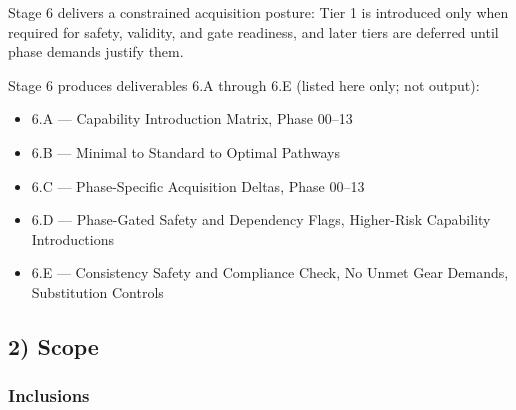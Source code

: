 \documentclass[10pt]{article}
\begin{document}
Stage 6 delivers a constrained acquisition posture: Tier 1 is introduced only when required for safety, validity, and gate readiness, and later tiers are deferred until phase demands justify them.

Stage 6 produces deliverables 6.A through 6.E (listed here only; not output):

\begin{itemize}
\item 6.A — Capability Introduction Matrix, Phase 00–13
\item 6.B — Minimal to Standard to Optimal Pathways
\item 6.C — Phase-Specific Acquisition Deltas, Phase 00–13
\item 6.D — Phase-Gated Safety and Dependency Flags, Higher-Risk Capability Introductions
\item 6.E — Consistency Safety and Compliance Check, No Unmet Gear Demands, Substitution Controls
\end{itemize}

\subsection*{2) Scope}

\subsubsection*{Inclusions}
{}
\end{document}
